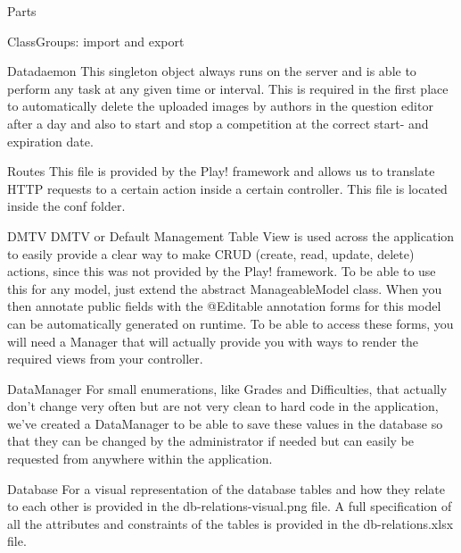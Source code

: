 \documentclass[]{article}
\begin{document}
\begin{section}{Parts}
\begin{subsection}{ClassGroups: import and export}
    \end{subsection}
    \begin{subsection}{Datadaemon}
        This singleton object always runs on the server and is able to perform
        any task at any given time or interval. This is required in the first place to automatically delete
        the uploaded images by authors in the question editor after a day and also to start and
        stop a competition at the correct start- and expiration date.
    \end{subsection}
    \begin{subsection}{Routes}
        This file is provided by the Play! framework and allows us to translate HTTP requests
        to a certain action inside a certain controller.
        This file is located inside the conf folder.
    \end{subsection}
    \begin{subsection}{DMTV}
        DMTV or Default Management Table View is used across the application to easily
        provide a clear way to make CRUD (create, read, update, delete) actions, since this
        was not provided by the Play! framework.
        To be able to use this for any model, just extend the abstract ManageableModel class.
        When you then annotate public fields with the @Editable annotation forms for this model
        can be automatically generated on runtime. To be able to access these forms, you will
        need a Manager that will actually provide you with ways to render the required
        views from your controller.
    \end{subsection}
    \begin{subsection}{DataManager}
        For small enumerations, like Grades and Difficulties, that actually don't change very
        often but are not very clean to hard code in the application, we've created a DataManager
        to be able to save these values in the database so that they can be changed by the
        administrator if needed but can easily be requested from anywhere within the application.
    \end{subsection}
    \begin{subsection}{Database}
        For a visual representation of the database tables and how they relate to each other is provided in the db-relations-visual.png file. A full specification of all the attributes and constraints of the tables is provided in the db-relations.xlsx file.
    \end{subsection}


\end{section}
\end{document}
